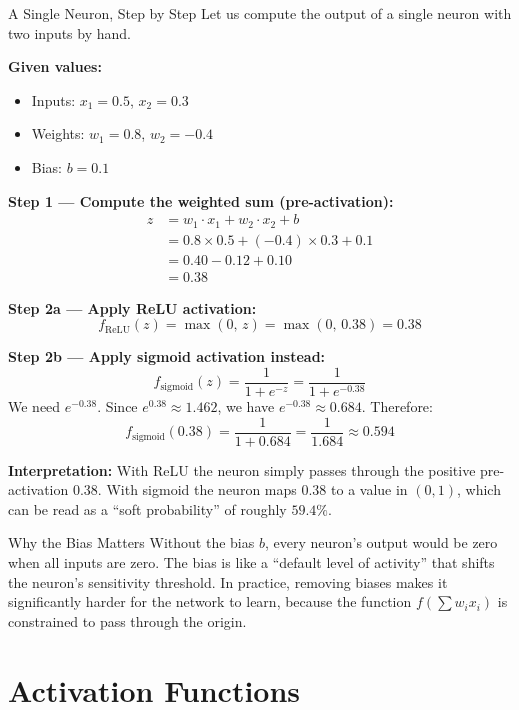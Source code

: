 \begin{examplebox}{A Single Neuron, Step by Step}
Let us compute the output of a single neuron with two inputs by hand.

\textbf{Given values:}
\begin{itemize}
    \item Inputs: $x_1 = 0.5$, $x_2 = 0.3$
    \item Weights: $w_1 = 0.8$, $w_2 = -0.4$
    \item Bias: $b = 0.1$
\end{itemize}

\textbf{Step 1 --- Compute the weighted sum (pre-activation):}
\begin{align*}
    z &= w_1 \cdot x_1 + w_2 \cdot x_2 + b \\
      &= 0.8 \times 0.5 + (-0.4) \times 0.3 + 0.1 \\
      &= 0.40 - 0.12 + 0.10 \\
      &= 0.38
\end{align*}

\textbf{Step 2a --- Apply ReLU activation:}
\[
    f_{\text{ReLU}}(z) = \max(0,\, z) = \max(0,\, 0.38) = \mathbf{0.38}
\]

\textbf{Step 2b --- Apply sigmoid activation instead:}
\[
    f_{\text{sigmoid}}(z) = \frac{1}{1 + e^{-z}} = \frac{1}{1 + e^{-0.38}}
\]
We need $e^{-0.38}$. Since $e^{0.38} \approx 1.462$, we have $e^{-0.38} \approx 0.684$. Therefore:
\[
    f_{\text{sigmoid}}(0.38) = \frac{1}{1 + 0.684} = \frac{1}{1.684} \approx \mathbf{0.594}
\]

\textbf{Interpretation:} With ReLU the neuron simply passes through the positive pre-activation $0.38$. With sigmoid the neuron maps $0.38$ to a value in $(0,1)$, which can be read as a ``soft probability'' of roughly $59.4\%$.
\end{examplebox}

\begin{keyinsight}{Why the Bias Matters}
Without the bias $b$, every neuron's output would be zero when all inputs are zero. The bias is like a ``default level of activity'' that shifts the neuron's sensitivity threshold. In practice, removing biases makes it significantly harder for the network to learn, because the function $f(\sum w_i x_i)$ is constrained to pass through the origin.
\end{keyinsight}

\section{Activation Functions}
\label{sec:activations}

